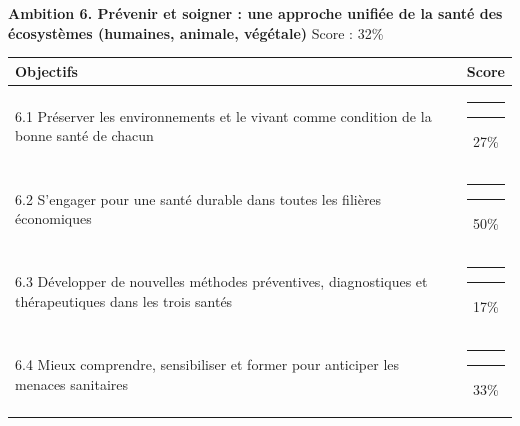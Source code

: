 \documentclass[
]{article}
\begin{document}
\needspace{8cm}
\vspace{0.8cm}

\textbf{\fontsize{10pt}{12pt}\selectfont Ambition 6. Prévenir et soigner : une approche unifiée de la santé des écosystèmes (humaines, animale, végétale)}
\hfill \small Score : 32\%

\begin{center}
\begin{tabular}{p{10cm}c}
\toprule
Objectifs & Score \\
\midrule
6.1 Préserver les environnements et le vivant comme condition de la bonne santé de chacun & {\color[HTML]{EB6E26}\rule{1.62cm}{3pt}}{\color{gray}\rule{4.38cm}{3pt}}\hspace{0.3cm}27\% \\
6.2 S’engager pour une santé durable dans toutes les filières économiques & {\color[HTML]{6E9E62}\rule{3cm}{3pt}}{\color{gray}\rule{3cm}{3pt}}\hspace{0.3cm}50\% \\
6.3 Développer de nouvelles méthodes préventives, diagnostiques et thérapeutiques dans les trois santés & {\color[HTML]{CC1414}\rule{1.02cm}{3pt}}{\color{gray}\rule{4.98cm}{3pt}}\hspace{0.3cm}17\% \\
6.4 Mieux comprendre, sensibiliser et former pour anticiper les menaces sanitaires & {\color[HTML]{EB6E26}\rule{1.98cm}{3pt}}{\color{gray}\rule{4.02cm}{3pt}}\hspace{0.3cm}33\% \\
\bottomrule
\end{tabular}
\end{center}
\end{document}
